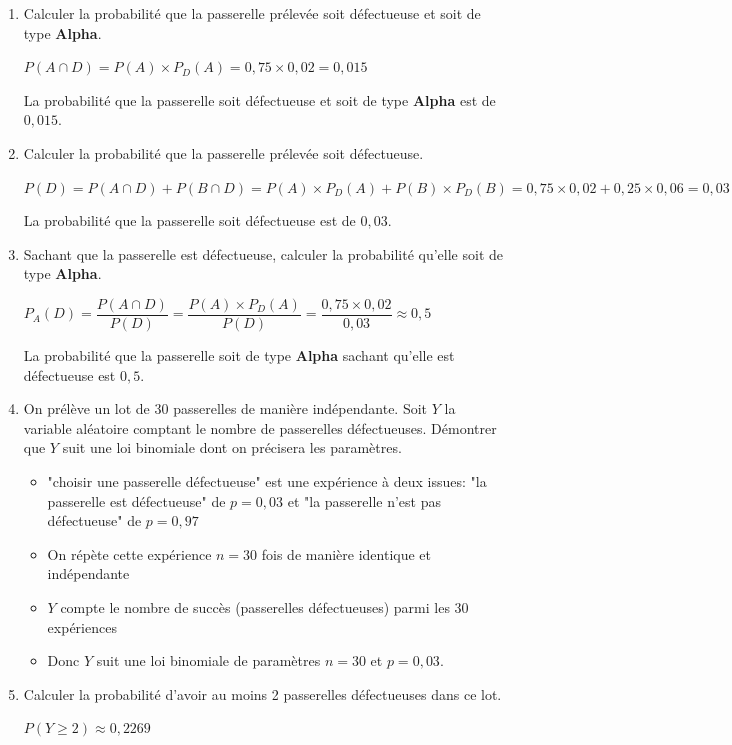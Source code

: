     
\begin{enumerate}[resume=monDS]
    \item Calculer la probabilité que la passerelle prélevée soit défectueuse et soit de type \textbf{Alpha}.
     \begin{blocvisiblex}[height=1.5]
    {\quad}
    $P(A\cap D)=P(A) \times P_D(A)=0,75 \times 0,02=0,015$

    \smallskip
    La probabilité que la passerelle soit défectueuse et soit de type \textbf{Alpha} est de $0,015$.
     \end{blocvisiblex}
     \medskip
    \item Calculer la probabilité que la passerelle prélevée soit défectueuse.
    \begin{blocvisiblex}[height=1.5]
    {\quad}
    $P(D)=P(A\cap D)+P(B\cap D)=P(A) \times P_D(A)+P(B) \times P_D(B)=0,75 \times 0,02+0,25 \times 0,06=0,03$

        \smallskip
    La probabilité que la passerelle soit défectueuse est de $0,03$.
    \end{blocvisiblex}
    \medskip
    \item Sachant que la passerelle est défectueuse, calculer la probabilité qu'elle soit de type \textbf{Alpha}.
    \begin{blocvisiblex}[height=2]
    {\quad}
    $P_A(D)=\dfrac{P(A\cap D)}{P(D)}=\dfrac{P(A) \times P_D(A)}{P(D)}=\dfrac{0,75 \times 0,02}{0,03}\approx 0,5$

        \smallskip
    La probabilité que la passerelle soit de type \textbf{Alpha} sachant qu'elle est défectueuse est $0,5$.
     \end{blocvisiblex}
     \medskip
    \item  On prélève un lot de 30 passerelles de manière indépendante. Soit $Y$ la variable aléatoire comptant le nombre de passerelles défectueuses. Démontrer que $Y$ suit une loi binomiale dont on précisera les paramètres.
    \begin{blocvisiblex}[height=3.5]
    {\quad}
    \begin{itemize}
        \item "choisir une passerelle défectueuse" est une expérience à deux issues: "la passerelle est défectueuse" de $p=0,03$ et "la passerelle n'est pas défectueuse" de $p=0,97$
        \item On répète cette expérience $n=30$ fois de manière identique et indépendante
        \item $Y$ compte le nombre de succès (passerelles défectueuses) parmi les 30 expériences
        \item Donc $Y$ suit une loi binomiale de paramètres $n=30$ et $p=0,03$.
    \end{itemize}
    \end{blocvisiblex}
        \medskip
        \item Calculer la probabilité d'avoir au moins 2 passerelles défectueuses dans ce lot.
    \begin{blocvisiblex}[height=1.5]
    {\quad}
    $P(Y\geq 2)\approx 0,2269$


\end{blocvisiblex}
\end{enumerate}
